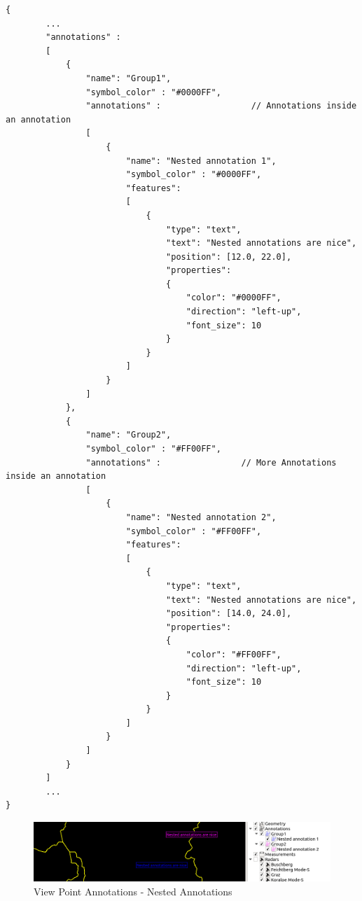 \begin{lstlisting}[basicstyle=\small\ttfamily]
{
        ...
        "annotations" :
        [
            {
                "name": "Group1",
                "symbol_color" : "#0000FF",
                "annotations" :                  // Annotations inside an annotation
                [
                    {
                        "name": "Nested annotation 1",
                        "symbol_color" : "#0000FF",
                        "features":
                        [
                            {
                                "type": "text",
                                "text": "Nested annotations are nice",
                                "position": [12.0, 22.0],
                                "properties":
                                {
                                    "color": "#0000FF",
                                    "direction": "left-up",
                                    "font_size": 10
                                }
                            }
                        ]
                    }
                ]
            },
            {
                "name": "Group2",
                "symbol_color" : "#FF00FF",
                "annotations" :                // More Annotations inside an annotation
                [
                    {
                        "name": "Nested annotation 2",
                        "symbol_color" : "#FF00FF",
                        "features":
                        [
                            {
                                "type": "text",
                                "text": "Nested annotations are nice",
                                "position": [14.0, 24.0],
                                "properties":
                                {
                                    "color": "#FF00FF",
                                    "direction": "left-up",
                                    "font_size": 10
                                }
                            }
                        ]
                    }
                ]
            }                
        ]
        ... 
}
\end{lstlisting}

\begin{figure}[H]
    \center
        \includegraphics[width=14cm]{figures/viewpoints_anno_example_nested.png}
    \caption{View Point Annotations - Nested Annotations} 
\end{figure}

